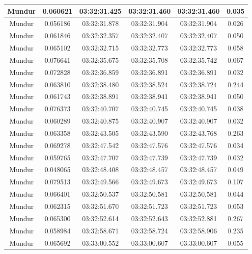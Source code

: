 \begin{longtable}{|c|c|c|c|c|c|}
      Mundur & 0.060621 & 03:32:31.425 & 03:32:31.460 & 03:32:31.460 & 0.035 \\ \hline
      Mundur & 0.056186 & 03:32:31.878 & 03:32:31.904 & 03:32:31.904 & 0.026 \\ \hline
      Mundur & 0.061846 & 03:32:32.357 & 03:32:32.407  & 03:32:32.407  & 0.050 \\ \hline
      Mundur & 0.065102 & 03:32:32.715 & 03:32:32.773 & 03:32:32.773 & 0.058 \\ \hline
      Mundur & 0.076641 & 03:32:35.675 & 03:32:35.708 & 03:32:35.742 & 0.067 \\ \hline
      Mundur & 0.072828 & 03:32:36.859 & 03:32:36.891 & 03:32:36.891 & 0.032 \\ \hline
      Mundur & 0.063810 & 03:32:38.480 & 03:32:38.524 & 03:32:38.724 & 0.244 \\ \hline
      Mundur & 0.061743 & 03:32:38.891 & 03:32:38.941 & 03:32:38.941 & 0.050 \\ \hline
      Mundur & 0.076373 & 03:32:40.707 & 03:32:40.745 & 03:32:40.745 & 0.038 \\ \hline
      Mundur & 0.060289 & 03:32:40.875 & 03:32:40.907 & 03:32:40.907 & 0.032 \\ \hline
      Mundur & 0.063358 & 03:32:43.505 & 03:32:43.590 & 03:32:43.768 & 0.263 \\ \hline
      Mundur & 0.069278 & 03:32:47.542 & 03:32:47.576 & 03:32:47.576 & 0.034 \\ \hline
      Mundur & 0.059765 & 03:32:47.707 & 03:32:47.739  & 03:32:47.739  & 0.032 \\ \hline
      Mundur & 0.048065 & 03:32:48.408 & 03:32:48.457 & 03:32:48.457 & 0.049 \\ \hline
      Mundur & 0.079513 & 03:32:49.566 & 03:32:49.673 & 03:32:49.673 & 0.107 \\ \hline
      Mundur & 0.066401 & 03:32:50.537 & 03:32:50.581 & 03:32:50.581 & 0.044 \\ \hline
      Mundur & 0.062315 & 03:32:51.670 & 03:32:51.723 & 03:32:51.723 & 0.053 \\ \hline
      Mundur & 0.065300 & 03:32:52.614 & 03:32:52.643 & 03:32:52.881 & 0.267 \\ \hline
      Mundur & 0.058984 & 03:32:58.671 & 03:32:58.724  & 03:32:58.906 & 0.235 \\ \hline
      Mundur & 0.065692 & 03:33:00.552 & 03:33:00.607 & 03:33:00.607 & 0.055 \\ \hline
\end{longtable}


